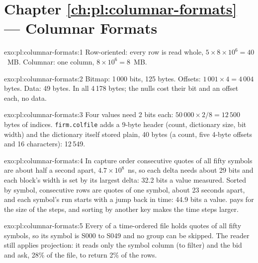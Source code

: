 \section*{Chapter \ref{ch:pl:columnar-formats} --- Columnar Formats}

\begin{solution}{exo:pl:columnar-formats:1}
Row-oriented: every row is read whole, $5 \times 8 \times 10^6 = 40$~MB. Columnar: one column, $8 \times 10^6 = 8$~MB.
\end{solution}

\begin{solution}{exo:pl:columnar-formats:2}
Bitmap: 1\,000 bits, 125 bytes. Offsets: $1\,001 \times 4 = 4\,004$ bytes. Data: 49 bytes. In all 4\,178 bytes; the nulls cost
their bit and an offset each, no data.
\end{solution}

\begin{solution}{exo:pl:columnar-formats:3}
Four values need 2 bits each: $50\,000 \times 2 / 8 = 12\,500$ bytes of indices. \texttt{firm.colfile} adds a 9-byte header
(count, dictionary size, bit width) and the dictionary itself stored plain, 40 bytes (a count, five 4-byte offsets and 16
characters): 12\,549.
\end{solution}

\begin{solution}{exo:pl:columnar-formats:4}
In capture order consecutive quotes of all fifty symbols are about half a second apart, $4.7\times10^8$~ns, so each delta needs
about 29 bits and each block's width is set by its largest delta: 32.2 bits a value measured. Sorted by symbol, consecutive rows
are quotes of one symbol, about 23 seconds apart, and each symbol's run starts with a jump back in time: 44.9 bits a value.  pays for the size of the steps, and sorting by another key makes the time steps larger.
\end{solution}

\begin{solution}{exo:pl:columnar-formats:5}
Every  of a time-ordered file holds quotes of all fifty symbols, so its symbol  is S000 to S049 and no group can
be skipped. The reader still applies projection: it reads only the symbol column (to filter) and the bid and ask, 28\% of the
file, to return 2\% of the rows.
\end{solution}

